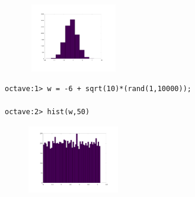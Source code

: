 \documentclass[12pt]{report}
\begin{document}
\begin{figure}[h]
  \includegraphics[width=4cm, height=3cm]{hist.png}
\end{figure}

\begin{lstlisting}[basicstyle=\small]
octave:1> w = -6 + sqrt(10)*(rand(1,10000));

octave:2> hist(w,50)
\end{lstlisting}

\begin{figure}[h]
  \includegraphics[width=4cm, height=3cm]{hist2.png}
\end{figure}
\end{document}
